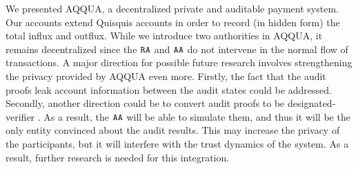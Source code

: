 We presented AQQUA, a decentralized private and auditable payment system. 
Our accounts extend Quisquis accounts in order to record (in hidden form) the total influx and outflux.
While we introduce two authorities in AQQUA, it remains decentralized since the $\RA$ and $\AA$ do not intervene in the normal flow of transactions.
A major direction for possible future research involves strengthening the privacy provided by AQQUA even more.
Firstly, the fact that the audit proofs leak account information between the audit states could be addressed. 
Secondly, another direction could be to convert audit proofs to be designated-verifier \cite{DVP}.
As a result, the $\AA$ will be able to simulate them, and thus it will be the only entity convinced about the audit results. 
This may increase the privacy of the participants, but it will interfere with the trust dynamics of the system. 
As a result, further research is needed for this integration. 

